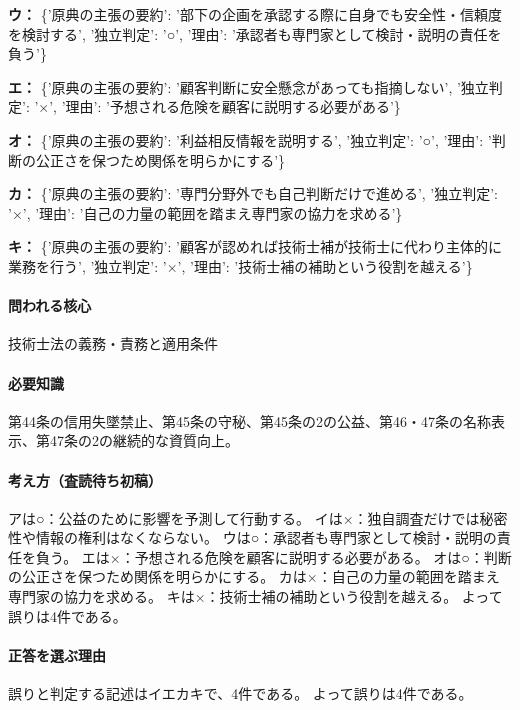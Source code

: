 \noindent\textbf{ウ：} \{'原典の主張の要約': '部下の企画を承認する際に自身でも安全性・信頼度を検討する', '独立判定': '○', '理由': '承認者も専門家として検討・説明の責任を負う'\}\par

\noindent\textbf{エ：} \{'原典の主張の要約': '顧客判断に安全懸念があっても指摘しない', '独立判定': '×', '理由': '予想される危険を顧客に説明する必要がある'\}\par

\noindent\textbf{オ：} \{'原典の主張の要約': '利益相反情報を説明する', '独立判定': '○', '理由': '判断の公正さを保つため関係を明らかにする'\}\par

\noindent\textbf{カ：} \{'原典の主張の要約': '専門分野外でも自己判断だけで進める', '独立判定': '×', '理由': '自己の力量の範囲を踏まえ専門家の協力を求める'\}\par

\noindent\textbf{キ：} \{'原典の主張の要約': '顧客が認めれば技術士補が技術士に代わり主体的に業務を行う', '独立判定': '×', '理由': '技術士補の補助という役割を越える'\}\par

\paragraph{問われる核心} 技術士法の義務・責務と適用条件

\paragraph{必要知識} 第44条の信用失墜禁止、第45条の守秘、第45条の2の公益、第46・47条の名称表示、第47条の2の継続的な資質向上。

\paragraph{考え方（査読待ち初稿）} アは○：公益のために影響を予測して行動する。 イは×：独自調査だけでは秘密性や情報の権利はなくならない。 ウは○：承認者も専門家として検討・説明の責任を負う。 エは×：予想される危険を顧客に説明する必要がある。 オは○：判断の公正さを保つため関係を明らかにする。 カは×：自己の力量の範囲を踏まえ専門家の協力を求める。 キは×：技術士補の補助という役割を越える。 よって誤りは4件である。

\paragraph{正答を選ぶ理由} 誤りと判定する記述はイエカキで、4件である。  よって誤りは4件である。

